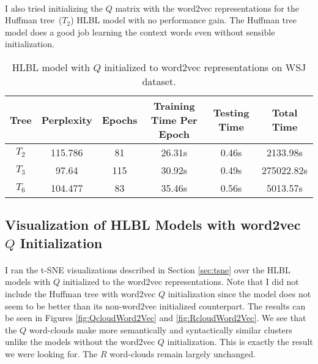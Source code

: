 \paragraph{}
I also tried initializing the $Q$ matrix with the word2vec representations for the Huffman tree~($T_2$) HLBL model with no performance gain. The Huffman tree model does a good job learning the context words even without sensible initialization. 

\begin{table*} \centering
{}
\begin{tabular}{cccccc}\toprule
Tree & Perplexity & Epochs & Training Time Per Epoch & Testing Time & Total Time\\ 
\midrule
$T_2$ & 115.786 & 81 & 26.31s &0.46s & 2133.98s \\
$T_3$ & 97.64 & 115& 30.92s & 0.49s& 275022.82s\\
$T_6$& 104.477 & 83& 35.46s & 0.56s& 5013.57s\\
\bottomrule
\end{tabular}
\caption{HLBL model with $Q$ initialized to word2vec representations on WSJ dataset.}
\label{tab:brownWord2vec}
\end{table*}

\subsection{Visualization of HLBL Models with word2vec $Q$ Initialization}
\paragraph{}
I ran the t-SNE visualizations described in Section \ref{sec:tsne} over the HLBL models with $Q$ initialized to the word2vec representations. Note that I did not include the Huffman tree with word2vec $Q$ initialization since the model does not seem to be better than its non-word2vec initialized counterpart. The results can be seen in Figures \ref{fig:QcloudWord2Vec} and \ref{fig:RcloudWord2Vec}. We see that the $Q$ word-clouds make more semantically and syntactically similar clusters unlike the models without the word2vec $Q$ initialization. This is exactly the result we were looking for. The $R$ word-clouds remain largely unchanged. 


